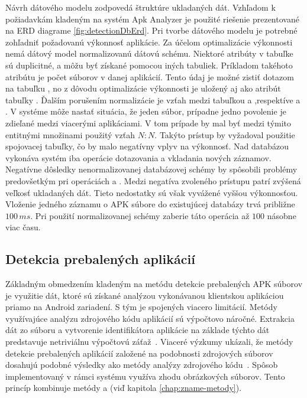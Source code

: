 Návrh dátového modelu zodpovedá štruktúre ukladaných dát. Vzhľadom k požiadavkám kladeným na systém Apk Analyzer je použité riešenie prezentované na ERD diagrame \ref{fig:detectionDbErd}. Pri tvorbe dátového modelu je potrebné zohľadniť požadovanú výkonnosť aplikácie. Za účelom optimalizácie výkonnosti nemá dátový model normalizovanú dátovú schému. Niektoré atribúty v tabuľke  sú duplicitné, a môžu byť získané pomocou iných tabuliek. Príkladom takéhoto atribútu je počet  súborov v danej aplikácií. Tento údaj je možné zistiť dotazom na tabuľku , no z dôvodu optimalizácie výkonnosti je uložený aj ako atribút tabuľky .
Ďalším porušením normalizácie je vzťah medzi tabuľkou  a ,respektíve  a . V systéme môže nastať situácia, že jeden súbor, prípadne jedno povolenie je zdieľané medzi viacerými aplikáciami. V tom prípade by mal byť medzi týmito entitnými množinami použitý vzťah $N : N$. Takýto prístup by vyžadoval použitie spojovacej tabuľky, čo by malo negatívny vplyv na výkonnosť. Nad databázou vykonáva systém  iba operácie dotazovania a vkladania nových záznamov. Negatívne dôsledky nenormalizovanej databázovej schémy by spôsobili problémy predovšetkým pri operáciách  a . Medzi negatíva zvoleného prístupu patrí zvýšená veľkosť ukladaných dát. Tieto nedostatky sú však vyvážené vyššou výkonnosťou. Vloženie jedného záznamu o APK súbore do existujúcej databázy trvá približne $100\, ms$. Pri použití normalizovanej schémy zaberie táto operácia až $100$ násobne viac času.  

\subsection{Detekcia prebalených aplikácií}

Základným obmedzením kladeným na metódu detekcie prebalených APK súborov je využitie dát, ktoré sú získané analýzou vykonávanou klientskou aplikáciou priamo na Android zariadení. S tým je spojených viacero limitácií. 
Metódy využívajúce analýzu zdrojového kódu aplikácií sú výpočtovo náročné. Extrakcia dát zo súboru  a vytvorenie identifikátora aplikácie na základe týchto dát predstavuje netriviálnu výpočtovú záťaž~\cite{Zhou2012}. Viaceré výzkumy ukázali, že metódy detekcie prebalených aplikácií založené na podobnosti zdrojových súborov dosahujú podobné výsledky ako metódy analýzy zdrojového kódu~\cite{Gadyatskaya2016,Zhauniarovich2014, ImageStruct}. Spôsob implementovaný v rámci systému  využíva zhodu obrázkových súborov. Tento princíp kombinuje metódy  a  (viď kapitola \ref{chap:zname-metody}). 

